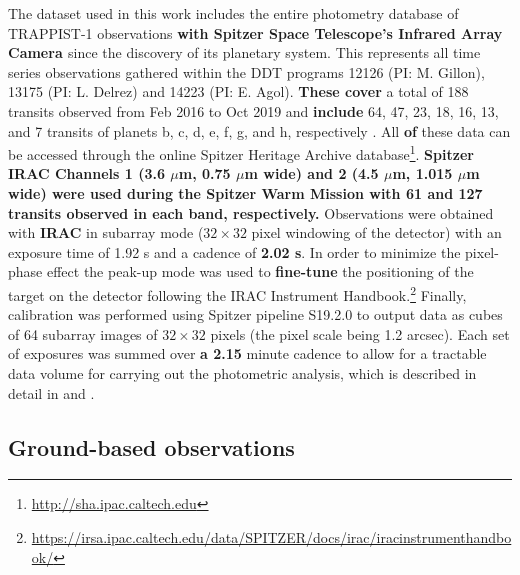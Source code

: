 \documentclass[twocolumn]{aastex63}
\begin{document}
The dataset used in this work includes the entire photometry database of TRAPPIST-1 observations \textbf{with Spitzer Space \textbf{Telescope}'s Infrared Array Camera \citep[IRAC;][] {Carey2004}} since the discovery of its planetary system. This represents all time series observations gathered within the DDT programs 12126 (PI: M. Gillon), 13175 (PI: L. Delrez) and 14223 (PI: E. Agol). \textbf{These cover} a total of 188 transits observed from Feb 2016 to Oct 2019 and \textbf{include} 64, 47, 23, 18, 16, 13, and 7 transits of planets b, c, d, e, f, g, and h, respectively \citep{Ducrot2020}. All \textbf{of} these data can be accessed through the online Spitzer Heritage Archive database\footnote{\url{http://sha.ipac.caltech.edu}}.  \textbf{Spitzer IRAC Channels 1 (3.6 $\mu$m, 0.75 $\mu$m wide) and
2 (4.5 $\mu$m, 1.015 $\mu$m wide) were used during the Spitzer Warm Mission \textbf{\citep{Fazio2004,StorrieLombardi2010}} with 61 and 127 transits observed in each band, respectively.}
Observations were obtained with \textbf{IRAC} in subarray mode ($32{\times}32$ pixel windowing of the detector) with an exposure time of 1.92 s and a cadence of \textbf{2.02 s}. In order to minimize the pixel-phase effect \citep{Knutson2008} the peak-up mode was used \citep{Ingalls2016} to \textbf{fine-tune} the positioning of the target on the detector following the IRAC Instrument Handbook.\footnote{\url{https://irsa.ipac.caltech.edu/data/SPITZER/docs/irac/iracinstrumenthandbook/}} Finally, calibration was performed using Spitzer pipeline S19.2.0 to output data as cubes of 64 subarray images of $32{\times}32$ pixels (the pixel scale being 1.2 arcsec). Each set of exposures was summed over  \textbf{a 2.15} minute cadence to allow for a tractable data volume for carrying out the photometric analysis, which is described in detail in \citet{Delrez2018a} and \citet{Ducrot2020}.

\subsection{Ground-based observations} \label{sec:groundbasedobs}


\end{document}
